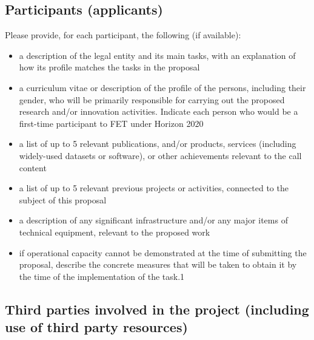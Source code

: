 \documentclass[12pt, a4paper]{article} %
\begin{document}
 \subsection{Participants (applicants)}

 
 Please provide, for each participant, the following (if available):
 \begin{itemize}
 \item a description of the legal entity and its main tasks, with an
   explanation of how its profile matches the tasks in the proposal
 \item a curriculum vitae or description of the profile of the
   persons, including their gender, who will be primarily responsible
   for carrying out the proposed research and/or innovation
   activities. Indicate each person who would be a first-time
   participant to FET under Horizon 2020
 \item a list of up to 5 relevant publications, and/or products,
   services (including widely-used datasets or software), or other
   achievements relevant to the call content
 \item a list of up to 5 relevant previous projects or activities,
   connected to the subject of this proposal
 \item a description of any significant infrastructure and/or any
   major items of technical equipment, relevant to the proposed work
 \item if operational capacity cannot be demonstrated at the time of
   submitting the proposal, describe the concrete measures that will
   be taken to obtain it by the time of the implementation of the
   task.1
 \end{itemize}

 \subsection{Third parties involved in the project (including use of third party resources)}
\end{document}
